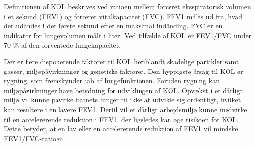 Definitionen af KOL beskrives ved ratioen mellem forceret eksspiratorisk volumen i et sekund (FEV1) og forceret vitalkapacitet (FVC). FEV1 måles ud fra, hvad der udåndes i det første sekund efter en maksimal indånding. FVC er en indikator for lungevolumen målt i liter. Ved tilfælde af KOL er FEV1/FVC under 70 \% af den forventede lungekapacitet. \cite{Basisbogen2016}


Der er flere disponerende faktorer til KOL heriblandt skadelige partikler samt gasser, miljøpåvirkninger og genetiske faktorer. Den hyppigste årsag til KOL er rygning, som fremskynder tab af lungefunktionen.\cite{Basisbogen2016,Martinez2016,dsam2016} Foruden rygning kan miljøpåvirkninger have betydning for udviklingen af KOL. Opvækst i et dårligt miljø vil kunne påvirke barnets lunger til ikke at udvikle sig ordentligt, hvilket kan resultere i en lavere FEV1. Dertil vil et dårligt arbejdsmiljø kunne medvirke til en accelererende reduktion i FEV1, der ligeledes kan øge risikoen for KOL. \cite{Martinez2016} Dette betyder, at en lav eller en accelererende reduktion af FEV1 vil mindske FEV1/FVC-ratioen.  
